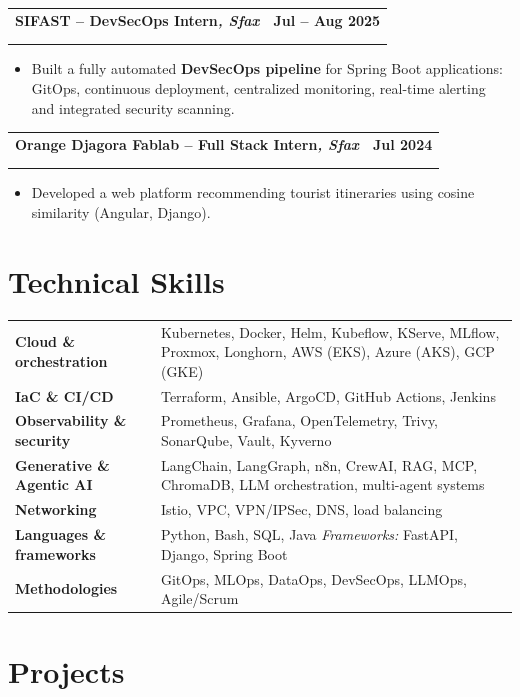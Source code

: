 \documentclass[a4paper,10pt]{article}
\makeatletter
\newcommand{\entry}[4]{%
\vspace{2pt}
\begin{tabular*}{\textwidth}{@{}l@{\extracolsep{\fill}}r@{}}
\textbf{#1} & \textbf{\small #2} \\
\ifstrempty{#3#4}{}{\textit{\small #3} & \textit{\small #4} \\}
\end{tabular*}\par\vspace{-1pt}
}
\makeatother
\begin{document}
\entry
{SIFAST -- DevSecOps Intern\textnormal{\textit{\small, Sfax}}}
{Jul -- Aug 2025}{}{}
\begin{itemize}
\item Built a fully automated \textbf{DevSecOps pipeline} for Spring Boot
applications: GitOps, continuous deployment, centralized monitoring,
real-time alerting and integrated security scanning.
\end{itemize}

\entry
{Orange Djagora Fablab -- Full Stack Intern\textnormal{\textit{\small, Sfax}}}
{Jul 2024}{}{}
\begin{itemize}
\item Developed a web platform recommending tourist itineraries using
cosine similarity (Angular, Django).
\end{itemize}

\section{Technical Skills}
\small

\begin{tabular}{@{}p{4.1cm}@{}p{\dimexpr\textwidth-4.1cm\relax}@{}}
\textbf{Cloud \& orchestration}
& Kubernetes, Docker, Helm, Kubeflow, KServe, MLflow, Proxmox, Longhorn, AWS (EKS), Azure (AKS), GCP (GKE) \\
\textbf{IaC \& CI/CD}
& Terraform, Ansible, ArgoCD, GitHub Actions, Jenkins \\
\textbf{Observability \& security}
& Prometheus, Grafana, OpenTelemetry, Trivy, SonarQube, Vault, Kyverno \\
\textbf{Generative \& Agentic AI}
& LangChain, LangGraph, n8n, CrewAI, RAG, MCP, ChromaDB, LLM orchestration, multi-agent systems \\
\textbf{Networking}
& Istio, VPC, VPN/IPSec, DNS, load balancing \\
\textbf{Languages \& frameworks}
& Python, Bash, SQL, Java \quad \textit{Frameworks:} FastAPI, Django, Spring Boot \\
\textbf{Methodologies}
& GitOps, MLOps, DataOps, DevSecOps, LLMOps, Agile/Scrum \\
\end{tabular}

\section{Projects}
\small
\end{document}
